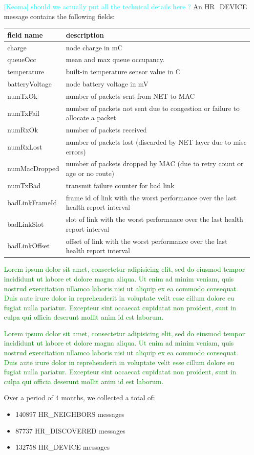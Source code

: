 \documentclass{sig-alternate}
\newcommand{\lorem}               {\textcolor{green}{Lorem ipsum dolor sit amet, consectetur adipisicing elit, sed do eiusmod tempor incididunt ut labore et dolore magna aliqua. Ut enim ad minim veniam, quis nostrud exercitation ullamco laboris nisi ut aliquip ex ea commodo consequat. Duis aute irure dolor in reprehenderit in voluptate velit esse cillum dolore eu fugiat nulla pariatur. Excepteur sint occaecat cupidatat non proident, sunt in culpa qui officia deserunt mollit anim id est laborum.}}
\newcommand{\keoma}[1]              {\textcolor{cyan}{[Keoma] #1}}
\begin{document}
\keoma{should we actually put all the technical details here ?}
An HR\_DEVICE message contains the following fields:\\
\begin{tabular}{l|p{6cm}}
    field name      & description\\
    \hline
    charge          & node charge in mC\\
    queueOcc        & mean and max queue occupancy.\\
    temperature     & built-in temperature sensor value in C\\
    batteryVoltage  & node battery voltage in mV\\
    numTxOk         & number of packets sent from NET to MAC\\
    numTxFail       & number of packets not sent due to congestion or failure to allocate a packet\\
    numRxOk         & number of packets received\\
    numRxLost       & number of packets lost (discarded by NET layer due to misc errors)\\
    numMacDropped   & number of packets dropped by MAC (due to retry count or age or no route)\\
    numTxBad        & transmit failure counter for bad link\\
    badLinkFrameId  & frame id of link with the worst performance over the last health report interval\\
    badLinkSlot     & slot of link with the worst performance over the last health report interval\\
    badLinkOffset   & offset of link with the worst performance over the last health report interval\\
\end{tabular}


\lorem


\lorem


Over a period of 4 months, we collected a total of:
\begin{itemize}
    \item 140897 HR\_NEIGHBORS messages\\
    \item 87737 HR\_DISCOVERED messages\\
    \item 132758 HR\_DEVICE messages\\
\end{itemize}
\end{document}
